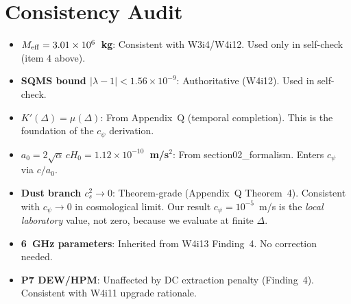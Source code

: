 \documentclass[11pt]{article}
\newcommand{\ee}[1]{\times 10^{#1}}
\newcommand{\lambdaone}{|\lambda{-}1|}
\begin{document}
\section{Consistency Audit}

\begin{itemize}
\item \textbf{$M_{\rm eff} = 3.01\ee{6}$~kg}: Consistent with W3i4/W4i12.
  Used only in self-check (item 4 above).
\item \textbf{SQMS bound $\lambdaone < 1.56\ee{-9}$}: Authoritative
  (W4i12). Used in self-check.
\item \textbf{$K'(\Delta) = \mu(\Delta)$}: From Appendix~Q (temporal
  completion). This is the foundation of the $c_\psi$ derivation.
\item \textbf{$a_0 = 2\sqrt{\alpha}\,cH_0 = 1.12\ee{-10}$~m/s$^2$}:
  From section02\_formalism. Enters $c_\psi$ via $c/a_0$.
\item \textbf{Dust branch $c_s^2 \to 0$}: Theorem-grade (Appendix~Q
  Theorem~4). Consistent with $c_\psi \to 0$ in cosmological limit.
  Our result $c_\psi = 10^{-5}$~m/s is the \emph{local laboratory}
  value, not zero, because we evaluate at finite $\Delta$.
\item \textbf{6~GHz parameters}: Inherited from W4i13 Finding~4.
  No correction needed.
\item \textbf{P7 DEW/HPM}: Unaffected by DC extraction penalty
  (Finding~4). Consistent with W4i11 upgrade rationale.
\end{itemize}
\end{document}
